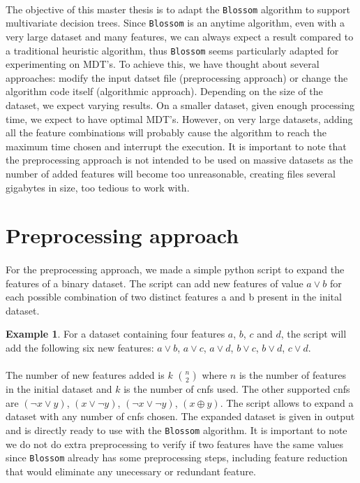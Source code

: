 \documentclass[12pt]{report}
\theoremstyle{definition}
\newtheorem*{example}{Example}
\theoremstyle{definition}
\theoremstyle{definition}
\begin{document}
\paragraph{} The objective of this master thesis is to adapt the \texttt{Blossom} algorithm to support multivariate
decision trees. Since \texttt{Blossom} is an anytime algorithm, even with a very large dataset and many features,
we can always expect a result compared to a traditional heuristic algorithm, thus \texttt{Blossom} seems particularly
adapted for experimenting on MDT's. To achieve this, we have thought about several approaches: modify the
input datset file (preprocessing approach) or change the algorithm code itself (algorithmic approach).
Depending on the size of the dataset, we expect varying results. On a smaller dataset, given enough
processing time, we expect to have optimal MDT's. However, on very large datasets, adding all the feature
combinations will probably cause the algorithm to reach the maximum time chosen and interrupt the execution.
It is important to note that the preprocessing approach is not intended to be used on massive datasets as
the number of added features will become too unreasonable, creating files several gigabytes in size,
too tedious to work with. 


\section{Preprocessing approach}
\paragraph{} For the preprocessing approach, we made a simple python script to expand the features of a binary
dataset. The script can add new features of value $a \lor b$ for each possible combination of two distinct
features a and b present in the inital dataset.

\begin{example}
    For a dataset containing four features $a$, $b$, $c$ and $d$, the script will add the following six new
    features: $a \lor b$, $a \lor c$, $a \lor d$, $b \lor c$, $b \lor d$, $c \lor d$.
\end{example}

\paragraph{} The number of new features added is $k$ $n \choose 2$ where $n$ is the number of features in
the initial dataset and $k$ is the number of cnfs used. The other supported cnfs are $(\neg x \lor y)$,
$(x \lor \neg y)$, $(\neg x \lor \neg y)$, $(x \oplus y)$. The script allows to expand a dataset with any number
of cnfs chosen. The expanded dataset is given in output and is directly ready to use with the \texttt{Blossom} algorithm.
It is important to note we do not do extra preprocessing to verify if two features have the same values since
\texttt{Blossom} already has some preprocessing steps, including feature reduction that would eliminate any unecessary or
redundant feature.
\end{document}
